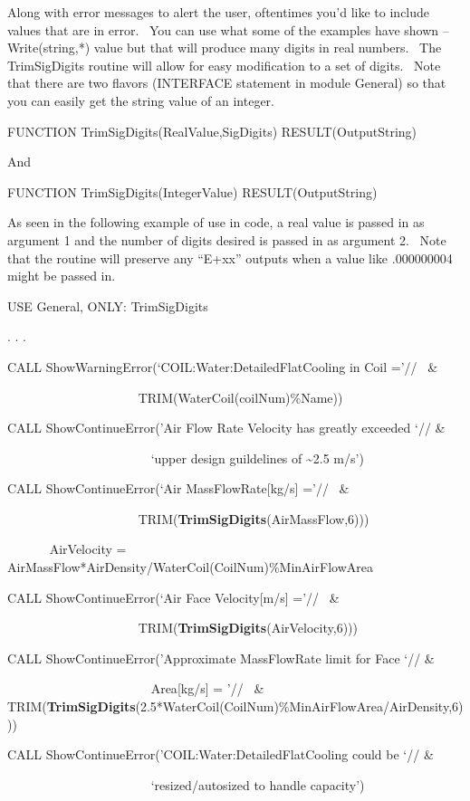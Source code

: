 Along with error messages to alert the user, oftentimes you'd like to include values that are in error.~ You can use what some of the examples have shown -- Write(string,*) value but that will produce many digits in real numbers.~ The TrimSigDigits routine will allow for easy modification to a set of digits.~ Note that there are two flavors (INTERFACE statement in module General) so that you can easily get the string value of an integer.

FUNCTION TrimSigDigits(RealValue,SigDigits) RESULT(OutputString)

And

FUNCTION TrimSigDigits(IntegerValue) RESULT(OutputString)

As seen in the following example of use in code, a real value is passed in as argument 1 and the number of digits desired is passed in as argument 2.~ Note that the routine will preserve any ``E+xx'' outputs when a value like .000000004 might be passed in.

USE General, ONLY: TrimSigDigits

. . .

CALL ShowWarningError(`COIL:Water:DetailedFlatCooling in Coil ='//~ \&

~~~~~~~~~~~~~~~~~~~~ TRIM(WaterCoil(coilNum)\%Name))

CALL ShowContinueError('Air Flow Rate Velocity has greatly exceeded `// \&

~~~~~~~~~~~~~~~~~~~~~~ `upper design guildelines of \textasciitilde{}2.5 m/s')

CALL ShowContinueError(`Air MassFlowRate{[}kg/s{]} ='//~ \&

~~~~~~~~~~~~~~~~~~~~ TRIM(\textbf{TrimSigDigits}(AirMassFlow,6)))

~~~~~~ AirVelocity = AirMassFlow*AirDensity/WaterCoil(CoilNum)\%MinAirFlowArea

CALL ShowContinueError(`Air Face Velocity{[}m/s{]} ='//~ \&

~~~~~~~~~~~~~~~~~~~~ TRIM(\textbf{TrimSigDigits}(AirVelocity,6)))

CALL ShowContinueError('Approximate MassFlowRate limit for Face `// \&

~~~~~~~~~~~~~~~~~~~~~~ Area{[}kg/s{]} = '//~ \&~~~~~~~~~~~~~~~~~~~~~~~~~~~~~ TRIM(\textbf{TrimSigDigits}(2.5*WaterCoil(CoilNum)\%MinAirFlowArea/AirDensity,6)))

CALL ShowContinueError('COIL:Water:DetailedFlatCooling could be `// \&

~~~~~~~~~~~~~~~~~~~~~~ `resized/autosized to handle capacity')

